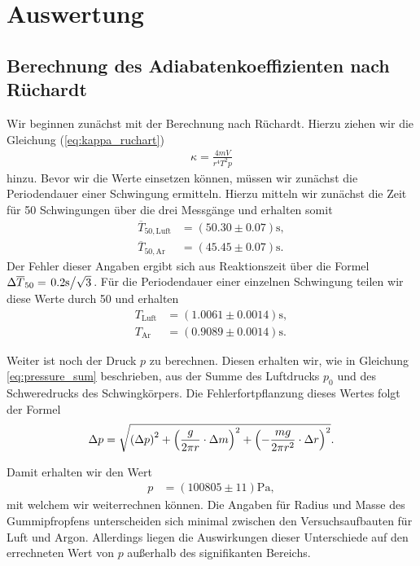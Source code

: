 \section{Auswertung}

\subsection{Berechnung des Adiabatenkoeffizienten nach Rüchardt}

Wir beginnen zunächst mit der Berechnung nach Rüchardt. Hierzu ziehen wir die Gleichung (\ref{eq:kappa_ruchart})
\begin{align}
  \kappa = \frac{4mV}{r^4 T^2 p}
\end{align}
hinzu. Bevor wir die Werte einsetzen können, müssen wir zunächst die Periodendauer einer Schwingung ermitteln. Hierzu mitteln wir zunächst die Zeit für 50 Schwingungen über die drei Messgänge und erhalten somit
\begin{align}
  \overline{T}_{50, \text{Luft}} &= (50.30 \pm 0.07) \si{\second},\\[1em]
  \overline{T}_{50, \text{Ar}} &= (45.45 \pm 0.07) \si{\second}.
\end{align}
Der Fehler dieser Angaben ergibt sich aus Reaktionszeit über die Formel $\Delta \overline{T}_{50} = \flatfrac{0.2\si{\second}}{\sqrt{3}}$. Für die Periodendauer einer einzelnen Schwingung teilen wir diese Werte durch 50 und erhalten
\begin{align}
  T_{\text{Luft}} &= (1.0061 \pm 0.0014) \si{\second},\\[1em]
  T_{\text{Ar}} &= (0.9089 \pm 0.0014) \si{\second}.
\end{align}

Weiter ist noch der Druck $p$ zu berechnen. Diesen erhalten wir, wie in Gleichung \eqref{eq:pressure_sum} beschrieben, aus der Summe des Luftdrucks $p_0$ und des Schweredrucks des Schwingkörpers. Die Fehlerfortpflanzung dieses Wertes folgt der Formel
\begin{align}
  \Delta p = \sqrt{\qty(\Delta p)^2 + \qty(\frac{g}{2 \pi r} \cdot \Delta m)^2 + \qty(-\frac{m g}{2 \pi r^2} \cdot \Delta r)^2}.
\end{align}

Damit erhalten wir den Wert
\begin{align}
p &= (100805 \pm 11) \si{\pascal},
\end{align}
mit welchem wir weiterrechnen können. Die Angaben für Radius und Masse des Gummipfropfens unterscheiden sich minimal zwischen den Versuchsaufbauten für Luft und Argon. Allerdings liegen die Auswirkungen dieser Unterschiede auf den errechneten Wert von $p$ außerhalb des signifikanten Bereichs.

